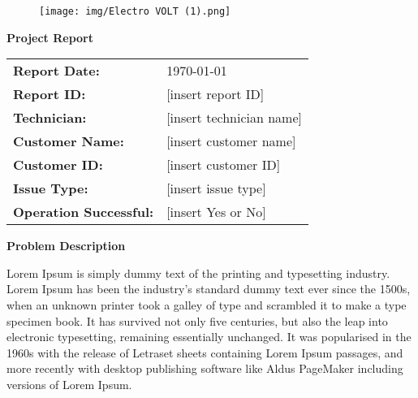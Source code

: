 \documentclass{article}
\begin{document}
\pagestyle{fancy}


\begin{figure}[htbp]
	\centering
	\texttt{[image: img/Electro VOLT (1).png]}
\end{figure}

\begin{center}
    \Huge \textbf{Project Report}
\end{center}

\vspace{5em}

\begin{tabularx}{\textwidth}{@{}l X@{}}
    \textbf{Report Date:} & \today \\
    \textbf{Report ID:} & [insert report ID] \\
    \textbf{Technician:} & [insert technician name] \\
    \textbf{Customer Name:} & [insert customer name] \\
    \textbf{Customer ID:} & [insert customer ID] \\
    \textbf{Issue Type:} & [insert issue type] \\
    \textbf{Operation Successful:} & [insert Yes or No] \\
\end{tabularx}

\vspace{1em}
\newpage

\begin{center}
    \textbf{Problem Description}
\end{center}

\vspace{1em}
Lorem Ipsum is simply dummy text of the printing and typesetting industry. Lorem Ipsum has been the industry's standard dummy text ever since the 1500s, when an unknown printer took a galley of type and scrambled it to make a type specimen book. It has survived not only five centuries, but also the leap into electronic typesetting, remaining essentially unchanged. It was popularised in the 1960s with the release of Letraset sheets containing Lorem Ipsum passages, and more recently with desktop publishing software like Aldus PageMaker including versions of Lorem Ipsum.
\end{document}
